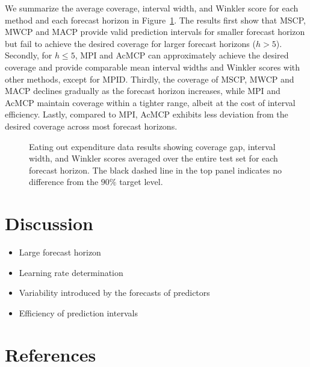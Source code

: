 \documentclass[
  11pt,
  a4paper,
]{article}
\theoremstyle{plain}
\theoremstyle{plain}
\theoremstyle{remark}
\begin{document}
We summarize the average coverage, interval width, and Winkler score for
each method and each forecast horizon in Figure~\ref{fig-cafe_result}.
The results first show that MSCP, MWCP and MACP provide valid prediction
intervals for smaller forecast horizon but fail to achieve the desired
coverage for larger forecast horizons (\(h>5\)). Secondly, for
\(h \leq 5\), MPI and AcMCP can approximately achieve the desired
coverage and provide comparable mean interval widths and Winkler scores
with other methods, except for MPID. Thirdly, the coverage of MSCP, MWCP
and MACP declines gradually as the forecast horizon increases, while MPI
and AcMCP maintain coverage within a tighter range, albeit at the cost
of interval efficiency. Lastly, compared to MPI, AcMCP exhibits less
deviation from the desired coverage across most forecast horizons.

\begin{figure}


\caption{\label{fig-cafe_result}Eating out expenditure data results
showing coverage gap, interval width, and Winkler scores averaged over
the entire test set for each forecast horizon. The black dashed line in
the top panel indicates no difference from the \(90\%\) target level.}

\end{figure}%

\section{Discussion}\label{discussion}

\begin{itemize}
\item
  Large forecast horizon
\item
  Learning rate determination
\item
  Variability introduced by the forecasts of predictors
\item
  Efficiency of prediction intervals
\end{itemize}

\section*{References}\label{references}
\end{document}
